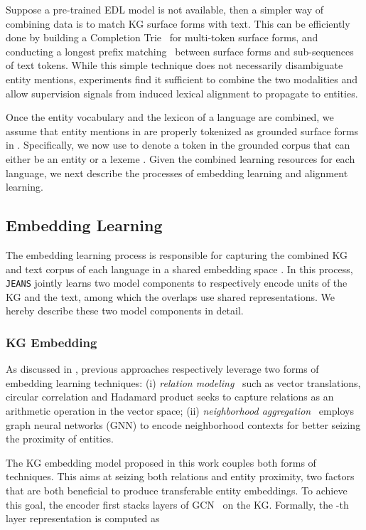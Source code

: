 \documentclass[11pt,a4paper]{article}
\newcommand{\stitle}[1]{\vspace{2ex} \noindent{\bf #1}}
\newcommand{\modelname}[0]{\texttt{JEANS}\xspace}
\begin{document}
\stitle{Surface form matching.} Suppose a pre-trained EDL model is not available, then a simpler way of combining data is to match KG surface forms with text.
This can be efficiently done by building a Completion Trie~\cite{hsu2013space} for multi-token surface forms, and conducting a longest prefix matching~\cite{dharmapurikar2006longest} between surface forms and sub-sequences of text tokens.
While this simple technique does not necessarily disambiguate entity mentions, experiments find it sufficient to combine the two modalities and allow supervision signals from induced lexical alignment to propagate to entities.


Once the entity vocabulary  and the lexicon  of a language are combined, we assume that entity mentions in  are properly tokenized as grounded surface forms in .
Specifically, we now use  to denote a token in the grounded corpus  that can either be an entity  or a lexeme .
Given the combined learning resources for each language, we next describe the processes of embedding learning and alignment learning.


\subsection{Embedding Learning}

The embedding learning process is responsible for capturing the combined KG and text corpus of each language in a shared embedding space .
In this process, \modelname jointly learns two model components to respectively encode units of the KG and the text,
among which the overlaps  use shared representations.
We hereby describe these two model components in detail.

\subsubsection{KG Embedding}

As discussed in ,
previous approaches respectively leverage two forms of embedding learning techniques: (i) \emph{relation modeling}~\cite{chen2017multigraph,sun2018bootstrapping} 
such as vector translations,
circular correlation and Hadamard product seeks to capture relations as an arithmetic operation in the vector space;
(ii) \emph{neighborhood aggregation}~\cite{wang2018cross,yang2019aligning,cao2019multi} employs graph neural networks (GNN) to encode neighborhood contexts for better seizing the proximity of entities.


The KG embedding model proposed in this work couples both forms of techniques. This aims at seizing both relations and entity proximity, two factors that are both beneficial to produce transferable entity embeddings.
To achieve this goal, the encoder first stacks  layers of GCN~\cite{kipf2017gcn} on the KG.
Formally, the -th layer representation  is computed as
\end{document}
